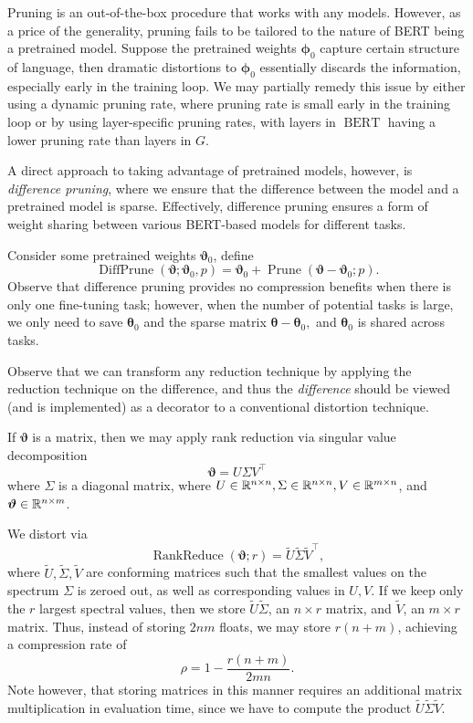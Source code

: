 \documentclass[10pt]{article}
\newcommand{\bert}{\operatorname{BERT}}
\newcommand{\prune}{\operatorname{Prune}}
\newcommand{\diffprune}{\operatorname{DiffPrune}}
\newcommand{\rankreduce}{\operatorname{RankReduce}}
\newcommand{\btheta}{{\bm{\theta}}}
\newcommand{\bphi}{{\bm{\phi}}}
\newcommand{\bvartheta}{{\bm{\vartheta}}}
\begin{document}
  Pruning is an out-of-the-box procedure that works with any models. However,
  as a price of the generality, pruning fails to be tailored to the nature of
  BERT being a pretrained model. Suppose the pretrained weights $\bphi_0 $
  capture certain structure of language, then dramatic distortions to
  $\bphi_0$ essentially discards the information, especially early in the
  training loop. We may partially remedy this issue by either using a dynamic
  pruning rate, where pruning rate is small early in the training loop or by
  using layer-specific pruning rates, with layers in $\bert$ having a lower
  pruning rate than layers in $G$. 
  
  A direct approach to taking advantage of pretrained models, however, is
  \emph{difference pruning}, where we ensure that the difference between the
  model and a pretrained model is sparse. Effectively, difference pruning
  ensures a form of weight sharing between various BERT-based models for
  different tasks.
  
 Consider some pretrained weights
$\bvartheta_0$, define \[
\diffprune(\bvartheta; \bvartheta_0, p ) = \bvartheta_0 + \prune(\bvartheta -
\bvartheta_0 ; p). 
\]
Observe that difference pruning provides no compression benefits when there is
only one fine-tuning task; however, when the number of potential tasks is
large, we only need to save $\btheta_0$ and the sparse matrix $\btheta -
\btheta_0,$ and $\btheta_0$ is shared across tasks.

Observe that we can transform any reduction technique by applying the
reduction technique on the difference, and thus the \emph{difference} should
be viewed (and is implemented) as a decorator to a conventional distortion
technique.


 If $\bvartheta$ is a matrix, then we may apply
rank
reduction via singular value decomposition \[
\bvartheta = U\Sigma V^\top
\]
where $\Sigma$ is a diagonal matrix, where $U \in \mathbb{R}^{n\times n}, \Sigma\in \mathbb{R}^
{n\times n}, V\in \mathbb{R}^{m\times n}$, and $\bvartheta \in \R^{n\times m}$.

We distort via \[
\rankreduce(\bvartheta; r) = \tilde U \tilde \Sigma \tilde V^\top,
\]
where $\tilde U, \tilde \Sigma, \tilde V$ are conforming matrices such that the
smallest values on the spectrum $\Sigma$ is zeroed out, as well as corresponding
values in $U,V$. If we keep only the $r$ largest spectral values, then we store
$\tilde U \tilde \Sigma$, an $n\times r$ matrix, and $\tilde V$, an $m\times r$
matrix. Thus, instead of storing $2nm$ floats, we may store $r(n+m)$, achieving
a compression rate of \[
\rho = 1-\frac{r(n+m)}{2mn}.
\]
Note however, that storing matrices in this manner requires an additional
matrix multiplication in evaluation time, since we have to compute the product
$\tilde U \tilde \Sigma \tilde V$. 
\end{document}
